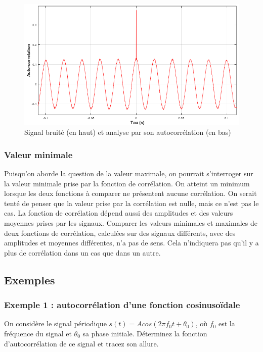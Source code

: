 	\begin{figure}[h!]
		\centering
		\includegraphics[scale=0.6]{images/Mesure_autocorr_2.png}
		\caption{Signal bruité (en haut) et analyse par son autocorrélation (en bas)}	
		\label{Fig:Mesure_autocorr_1} 
	\end{figure}
	
	\subsubsection{Valeur minimale}
	Puisqu'on aborde la question de la valeur maximale, on pourrait s'interroger sur la valeur minimale prise par la fonction de corrélation. On atteint un minimum lorsque les deux fonctions à comparer ne présentent aucune corrélation. On serait tenté de penser que la valeur prise par la corrélation est nulle, mais ce n'est pas le cas. La fonction de corrélation dépend aussi des amplitudes et des valeurs moyennes prises par les signaux. Comparer les valeurs minimales et maximales de deux fonctions de corrélation, calculées sur des signaux différents, avec des amplitudes et moyennes différentes, n'a pas de sens. Cela n'indiquera pas qu'il y a plus de corrélation dans un cas que dans un autre.
	
	
	\subsection{Exemples}
	
	\subsubsection{Exemple 1 : autocorrélation d'une fonction cosinusoïdale}
	
	On considère le signal périodique $s(t)=Acos(2\pi f_{0}t+\theta_{0})$, où $f_{0}$ est la fréquence du signal et $\theta_{0}$ sa phase initiale. Déterminez la fonction d'autocorrélation de ce signal et tracez son allure.
	
